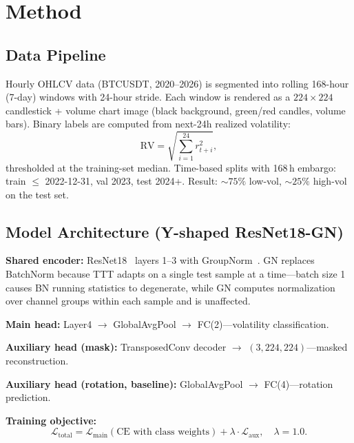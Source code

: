 \documentclass[11pt]{article}
\begin{document}
\section{Method}
\label{sec:method}

\subsection{Data Pipeline}
\label{sec:data_pipeline}

Hourly OHLCV data (BTCUSDT, 2020--2026) is segmented into rolling 168-hour (7-day)
windows with 24-hour stride. Each window is rendered as a $224\!\times\!224$ candlestick
+ volume chart image (black background, green/red candles, volume bars). Binary labels
are computed from next-24h realized volatility:
\begin{equation}
  \mathrm{RV} = \sqrt{\sum_{i=1}^{24} r_{t+i}^{2}},
  \label{eq:rv}
\end{equation}
thresholded at the training-set median. Time-based splits with 168\,h embargo:
train $\leq$ 2022-12-31, val 2023, test 2024+. Result: ${\sim}75\%$ low-vol,
${\sim}25\%$ high-vol on the test set.

\subsection{Model Architecture (Y-shaped ResNet18-GN)}
\label{sec:architecture}

\textbf{Shared encoder:} ResNet18~\cite{he2016resnet} layers 1--3 with
GroupNorm~\cite{wu2018groupnorm}. GN replaces BatchNorm because TTT adapts on a single
test sample at a time---batch size 1 causes BN running statistics to degenerate, while GN
computes normalization over channel groups within each sample and is unaffected.

\textbf{Main head:} Layer4 $\rightarrow$ GlobalAvgPool $\rightarrow$ FC(2)---volatility
classification.

\textbf{Auxiliary head (mask):} TransposedConv decoder $\rightarrow$
$(3, 224, 224)$---masked reconstruction.

\textbf{Auxiliary head (rotation, baseline):} GlobalAvgPool $\rightarrow$
FC(4)---rotation prediction.

\textbf{Training objective:}
\begin{equation}
  \mathcal{L}_{\text{total}}
    = \mathcal{L}_{\text{main}}(\text{CE with class weights})
    + \lambda \cdot \mathcal{L}_{\text{aux}},
  \quad \lambda = 1.0.
  \label{eq:loss}
\end{equation}
\end{document}

